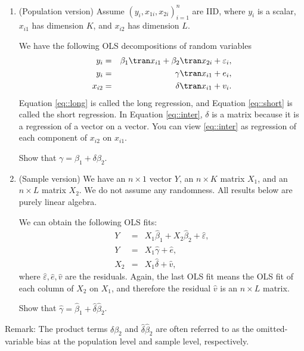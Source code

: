 \begin{enumerate}
[(1)]
\item
(Population version) Assume $(y_i, x_{1i}, x_{2i})_{i=1}^n$ are IID, where $y_i$ is a scalar, $x_{i1}$ has dimension $K$, and $x_{i2}$ has dimension $L$. 

We have the following OLS decompositions of random variables
\begin{eqnarray}
y_i &=& \beta_1 \tran x_{i1} + \beta_2  \tran x_{2i} + \varepsilon_i , \label{eq::long}\\
y_i&=&\gamma  \tran x_{i1} + e_i, \label{eq::short}\\
x_{i2} &=& \delta  \tran x_{i1} + v_i . \label{eq::inter}
\end{eqnarray}
Equation \eqref{eq::long} is called the long regression, and Equation \eqref{eq::short} is called the short regression. In Equation \eqref{eq::inter}, $\delta$ is a matrix because it is a regression of a vector on a vector. You can view \eqref{eq::inter} as regression of each component of $x_{i2}$ on $x_{i1}$. 

Show that $\gamma = \beta_1 + \delta \beta_2.$


\item
(Sample version) We have an $n\times 1$ vector $Y$, an $n\times K$ matrix $X_1$, and an $n\times L$ matrix $X_2$. We do not assume any randomness. All results below are purely linear algebra. 

We can obtain the following OLS fits: 
\begin{eqnarray*}
Y &=& X_1 \hat{\beta}_1 + X_2 \hat{\beta}_2+ \hat{\varepsilon},\\
Y &=& X_1 \hat{\gamma} + \hat{e} ,\\
X_2 &=& X_1 \hat{\delta} + \hat{v},
\end{eqnarray*}
where $\hat{\varepsilon},  \hat{e}, \hat{v}$ are the residuals. 
Again, the last OLS fit means the OLS fit of each column of $X_2$ on $X_1$, and therefore the residual $\hat{v}$ is an $n\times L$ matrix.

Show that $\hat{\gamma} = \hat{\beta}_1 +  \hat{\delta} \hat{\beta}_2$.

\end{enumerate}

 
Remark: The product terms  $\delta \beta_2$ and $\hat{\delta} \hat{\beta}_2$ are often referred to as the omitted-variable bias at the population level and sample level, respectively. 
 
 
 



